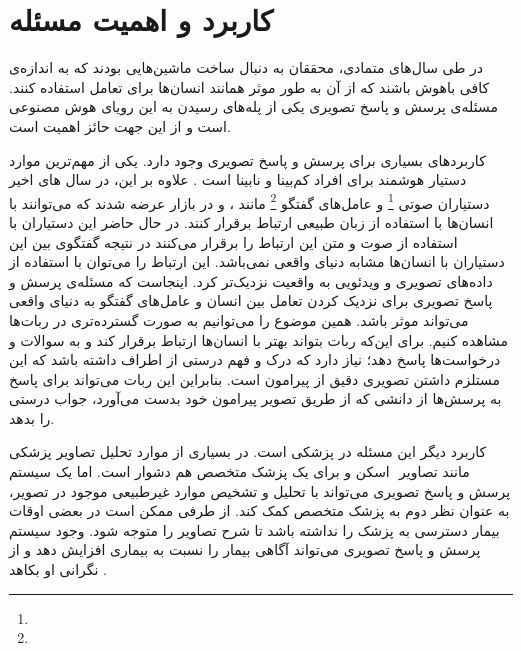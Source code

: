 \section{کاربرد و اهمیت مسئله}
	در طی سال‌های متمادی، محققان به دنبال ساخت ماشین‌هایی بودند که به اندازه‌ی کافی باهوش باشند که از آن به طور موثر همانند انسان‌ها برای تعامل استفاده کنند. مسئله‌ی پرسش و پاسخ تصویری یکی از پله‌های رسیدن به این رویای هوش مصنوعی است و از این جهت حائز اهمیت است.

کاربردهای بسیاری برای پرسش و پاسخ تصویری وجود دارد. یکی از مهم‌ترین موارد دستیار هوشمند برای افراد کم‌بینا و نابینا  است
	\cite{gurari2018vizwiz}.
 علاوه بر این، در سال های اخیر دستیاران صوتی
 	\footnote{}
   و عامل‌های گفتگو
    \footnote{}
     مانند  
،
و
  در بازار عرضه شدند که می‌توانند با انسان‌ها با استفاده از زبان طبیعی ارتباط برقرار کنند. در حال حاضر این دستیاران با استفاده از صوت و متن این ارتباط را برقرار می‌کنند در نتیجه گفتگوی بین این دستیاران با انسان‌ها مشابه دنیای واقعی نمی‌باشد. این ارتباط را می‌توان با استفاده از داده‌های تصویری و ویدئویی به واقعیت نزدیک‌تر کرد. اینجاست که مسئله‌ی پرسش و پاسخ تصویری برای نزدیک کردن تعامل بین انسان و عامل‌های گفتگو به دنیای واقعی می‌تواند موثر باشد.  همین موضوع را می‌توانیم به صورت گسترده‌تری در ربات‌ها مشاهده کنیم. برای این‌که ربات بتواند بهتر با انسان‌ها ارتباط برقرار کند و به سوالات و درخواست‌ها پاسخ دهد؛ نیاز دارد که درک و فهم درستی از اطراف داشته باشد که این مستلزم داشتن تصویری دقیق از پیرامون است. بنابراین این ربات می‌تواند برای پاسخ به پرسش‌ها از دانشی که از طریق تصویر پیرامون خود بدست می‌آورد، جواب درستی را بدهد. 
  
  کاربرد دیگر این مسئله در پزشکی است. در بسیاری از موارد تحلیل تصاویر پزشکی مانند تصاویر
   ‌ اسکن و 
   برای یک پزشک متخصص هم دشوار است. اما یک سیستم پرسش و پاسخ تصویری می‌تواند با تحلیل و تشخیص موارد غیرطبیعی موجود در تصویر، به عنوان نظر دوم به پزشک متخصص کمک کند. از طرفی ممکن است در بعضی اوقات بیمار دسترسی به پزشک را نداشته باشد تا شرح تصاویر را متوجه شود. وجود سیستم پرسش و پاسخ تصویری می‌تواند آگاهی بیمار را نسبت به بیماری افزایش دهد و از نگرانی او بکاهد
   \cite{talafha2018just}.

